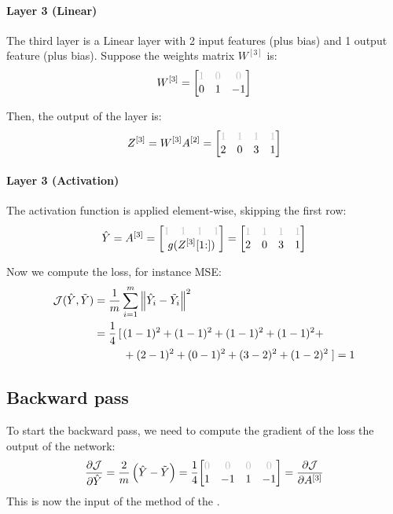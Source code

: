 \paragraph{Layer 3 (Linear)} The third layer is a Linear layer with 2 input features (plus bias) and 1 output feature (plus bias). Suppose the weights matrix $W^{[3]}$ is:
\begin{equation*}
    W^{[3]} = \mqty[
        \color{lightgray} 1 & \color{lightgray} 0 & \color{lightgray} 0 \\
        0 & 1 & -1
    ]
\end{equation*}

Then, the output of the layer is:
\begin{equation*}
    Z^{[3]} = W^{[3]} A^{[2]} = \mqty[
        \color{lightgray} 1 & \color{lightgray} 1 & \color{lightgray} 1 & \color{lightgray} 1 \\
        2 & 0 & 3 & 1
    ]
\end{equation*}

\paragraph{Layer 3 (Activation)} The activation function is applied element-wise, skipping the first row:
\begin{equation*}
    \hat{Y} = A^{[3]} = \mqty[
        \mqty{\color{lightgray} 1 & \color{lightgray} 1 & \color{lightgray} 1 & \color{lightgray} 1} \\
        g(Z^{[3]}[1\hspace{-0.6ex}:])
    ] = \mqty[
        \color{lightgray} 1 & \color{lightgray} 1 & \color{lightgray} 1 & \color{lightgray} 1 \\
        2 & 0 & 3 & 1
    ]
\end{equation*}

Now we compute the loss, for instance \ac{MSE}:
\begin{align*}
    \mathcal{J}(\hat{Y}, \tilde{Y}) &= \frac{1}{m} \sum_{i=1}^{m} \norm{\hat{Y}_i - \tilde{Y}_i}^2\\
    &\;\begin{aligned}
        = \frac{1}{4} \left[\right.&(1 - 1)^2 + (1 - 1)^2 + (1 - 1)^2 + (1 - 1)^2 + \\
        &+ (2 - 1)^2 + (0 - 1)^2 + (3 - 2)^2 + (1 - 2)^2\left.\right] = 1
    \end{aligned}
\end{align*}

\subsection{Backward pass}
To start the backward pass, we need to compute the gradient of the loss \wrt the output of the network:
\begin{equation*}
    \frac{\partial \J}{\partial \hat{Y}} = \frac{2}{m} \left(\hat{Y} - \tilde{Y}\right) = \frac{1}{4} \mqty[
        \color{lightgray} 0 & \color{lightgray} 0 & \color{lightgray} 0 & \color{lightgray} 0 \\
        1 & -1 & 1 & -1
    ] = \pdv{\J}{A^{[3]}}
\end{equation*}
This is now the input of the  method of the .


